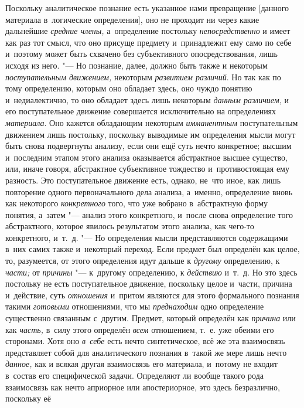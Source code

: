 Поскольку аналитическое познание есть указанное нами
превращение [данного материала в~логические определения], оно не проходит
ни через какие дальнейшие {\em средние
члены,} а~определение постольку
{\em непосредственно} и
имеет как раз тот смысл, что оно присуще предмету и~принадлежит ему само по
себе и~поэтому может быть схвачено без субъективного опосредствования, лишь
исходя из него. "--- Но познание, далее, должно быть также и
некоторым {\em поступательным
движением,} некоторым
{\em развитием различий}.
Но так как по тому определению, которым оно обладает здесь,
оно чуждо понятию и~недиалектично, то оно обладает здесь лишь некоторым
{\em данным различием,} и
его поступательное движение совершается исключительно на определениях
{\em материала}. Оно
кажется обладающим некоторым
{\em имманентным}
поступательным движением лишь постольку, поскольку выводимые
им определения мысли могут быть снова подвергнуты анализу, если они ещё
суть нечто конкретное; высшим и~последним этапом этого анализа оказывается
абстрактное высшее существо, или, иначе говоря, абстрактное субъективное
тождество и~противостоящая ему разность. Это поступательное движение есть,
однако, не~что иное, как лишь повторение одного первоначального дела
анализа, а~именно, определение вновь как некоторого
{\em конкретного} того,
что уже вобрано в~абстрактную форму понятия, а~затем
"--- анализ этого конкретного, и~после снова определение того
абстрактного, которое явилось результатом этого анализа, как чего-то
конкретного, и~т.~д. "--- Но определения мысли
представляются содержащими в~них самих также и~некоторый
переход. Если предмет был определён как целое, то, разумеется, от этого
определения идут дальше к {\em другому}
определению, к
{\em части;} от
{\em причины} "--- к~другому
определению, к {\em действию}
и~т.~д. Но это здесь постольку не есть поступательное
движение, поскольку целое и~части, причина и~действие, суть
{\em отношения} и~притом
являются для этого формального познания такими
{\em готовыми}
отношениями, что мы
{\em преднаходим} одно
определение существенно связанным с~другим. Предмет, который определён как
{\em причина} или как
{\em часть,} в~силу этого
определён {\em всем}
отношением, т.~е. уже обеими его сторонами. Хотя оно
{\em в~себе} есть нечто
синтетическое, всё же эта взаимосвязь представляет собой для аналитического
познания в~такой же мере лишь нечто
{\em данное,} как и
всякая другая взаимосвязь его материала, и~потому не входит в~состав его
специфической задачи. Определяют ли вообще такого рода взаимосвязь как
нечто априорное или апостериорное, это здесь безразлично, поскольку её
